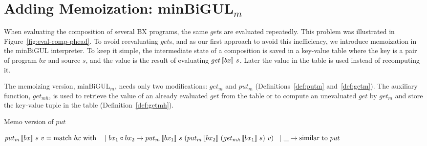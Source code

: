 \section{Adding Memoization: minBiGUL$_m$} \label{sect:minbigulm}

When evaluating the composition of several BX programs, 
the same $get$s are evaluated repeatedly.
This problem was illustrated in Figure~\ref{fig:eval-comp-phead}. To avoid reevaluating $get$s, and as our first approach to avoid this inefficiency, we introduce memoization in the minBiGUL interpreter.
To keep it simple, the intermediate state of a composition is saved in a key-value table where the key is a pair of program $bx$ and source $s$, and the value is the result of evaluating $get \, [\![bx]\!] \ s$.
Later the value in the table is used instead of recomputing it. 

The memoizing version, minBiGUL$_m$, needs only two modifications: $get_m$ and $put_m$ (Definitions~\ref{def:putm} and~\ref{def:getm}). The auxiliary function, $get_{mh}$, is used to retrieve the value of an already evaluated $get$ from the table or to compute an unevaluated $get$ by $get_m$ and store the key-value tuple in the table (Definition~\ref{def:getmh}).

\begin{definition} \label{def:putm} $\text{Memo version of } put$

    \noindent $\putm{bx}{s}{v} = \textnormal{match } bx \textnormal{ with }\\
        \tab \vert \ bx_1 \circ bx_2 \to \putm{bx_1}{s}{(\putm{bx_2}{(\getmh{bx_1}{s})}{v})} \\
        \tab \vert \ \_ \to \text{similar to } put$
\end{definition}

